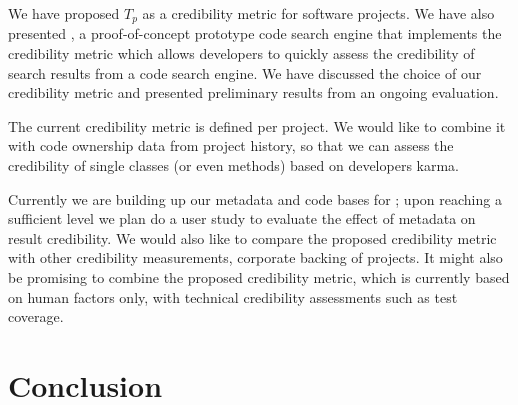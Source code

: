 \documentclass[10pt]{book}
\begin{document}

We have proposed $T_p$ as a credibility metric for software projects.  We have also presented \Jbd, a proof-of-concept prototype code search engine that implements the credibility metric which allows developers to quickly assess the credibility of search results from a code search engine. We have discussed the choice of our credibility metric and presented preliminary results from an ongoing evaluation. 


The current credibility metric is defined per project. We would like to combine it with code ownership data from project history, so that we can assess the credibility of single classes (or even methods) based on developers karma.

Currently we are building up our metadata and code bases for \Jbd; upon reaching a sufficient level we plan do a user study to evaluate the effect of metadata on result credibility. We would also like to compare the proposed credibility metric with other credibility measurements, \eg corporate backing of projects. It might also be promising to combine the proposed credibility metric, which is currently based on human factors only, with technical credibility assessments such as \eg test coverage. 

\chapter{Conclusion}
\label{the conclusion}



\end{document}

